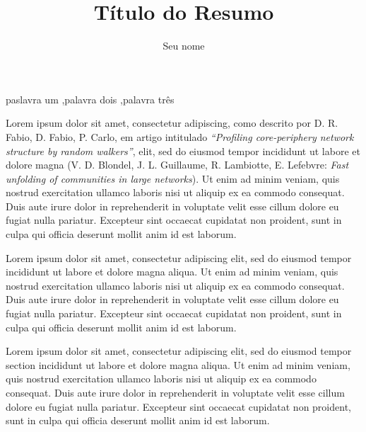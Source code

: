 \documentclass[preprint,12pt]{elsarticle}
\begin{document}

\begin{frontmatter}

\title{Título do Resumo} %
\author{Seu nome}

\begin{keyword}
paslavra um \sep palavra dois \sep palavra três
\end{keyword}

\end{frontmatter}

\linenumbers


Lorem ipsum dolor sit amet, consectetur adipiscing, como descrito por D. R. Fabio, D. Fabio, P. Carlo, em artigo intitulado \textit{``Profiling core-periphery network structure by random walkers''},   elit, sed do eiusmod tempor incididunt ut labore et dolore magna  (V. D. Blondel, J. L. Guillaume, R. Lambiotte, E. Lefebvre: \textit{Fast unfolding of communities in large networks}). Ut enim ad minim veniam, quis nostrud exercitation ullamco laboris nisi ut aliquip ex ea commodo consequat. Duis aute irure dolor in reprehenderit in voluptate velit esse cillum dolore eu fugiat nulla pariatur. Excepteur sint occaecat cupidatat non proident, sunt in culpa qui officia deserunt mollit anim id est laborum.

Lorem ipsum dolor sit amet, consectetur adipiscing elit, sed do eiusmod tempor incididunt ut labore et dolore magna aliqua. Ut enim ad minim veniam, quis nostrud exercitation ullamco laboris nisi ut aliquip ex ea commodo consequat. Duis aute irure dolor in reprehenderit in voluptate velit esse cillum dolore eu fugiat nulla pariatur. Excepteur sint occaecat cupidatat non proident, sunt in culpa qui officia deserunt mollit anim id est laborum.

Lorem ipsum dolor sit amet, consectetur adipiscing elit, sed do eiusmod tempor section incididunt ut labore et dolore magna aliqua. Ut enim ad minim veniam, quis nostrud exercitation ullamco laboris nisi ut aliquip ex ea commodo consequat. Duis aute irure dolor in reprehenderit in voluptate velit esse cillum dolore eu fugiat nulla pariatur. Excepteur sint occaecat cupidatat non proident, sunt in culpa qui officia deserunt mollit anim id est laborum.
\end{document}

